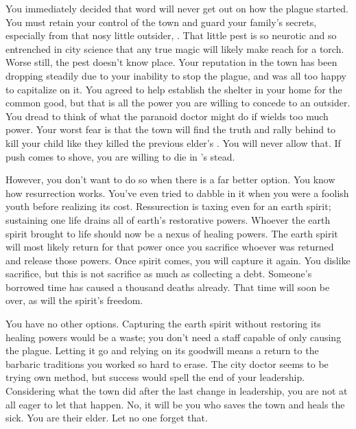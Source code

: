 \documentclass[char]{Pestilence}
\begin{document}
You immediately decided that word will never get out on how the plague started. You must retain your control of the town and guard your family's secrets, especially from that nosy little outsider, \cOutsider{}. That little pest is so neurotic and so entrenched in \cOutsider{\their} city science that any true magic will likely make \cOutsider{\them} reach for a torch. Worse still, the pest doesn't know \cOutsider{\their} place. Your reputation in the town has been dropping steadily due to your inability to stop the plague, and \cOutsider{} was all too happy to capitalize on it. You agreed to help \cOutsider{\them} establish the shelter in your home for the common good, but that is all the power you are willing to concede to an outsider. You dread to think of what the paranoid doctor might do if \cOutsider{\they} wields too much power. Your worst fear is that the town will find the truth and rally behind \cOutsider{\them} to kill your child like they killed the previous elder's \cPlaguebearer{\offspring}. You will never allow that. If push comes to shove, you are willing to die in \cRebel{}'s stead. 

However, you don't want to do so when there is a far better option. You know how resurrection works. You've even tried to dabble in it when you were a foolish youth before realizing its cost. Ressurection is taxing even for an earth spirit; sustaining one life drains all of earth's restorative powers. Whoever the earth spirit brought to life should now be a nexus of healing powers. The earth spirit will most likely return for that power once you sacrifice whoever was returned and release those powers. Once spirit comes, you will capture it again. You dislike sacrifice, but this is not sacrifice as much as collecting a debt. Someone's borrowed time has caused a thousand deaths already. That time will soon be over, as will the spirit's freedom. 

You have no other options. Capturing the earth spirit without restoring its healing powers would be a waste; you don't need a staff capable of only causing the plague. Letting it go and relying on its goodwill means a return to the barbaric traditions you worked so hard to erase. The city doctor seems to be trying \cOutsider{\their} own method, but \cOutsider{\their} success would spell the end of your leadership. Considering what the town did after the last change in leadership, you are not at all eager to let that happen. No, it will be you who saves the town and heals the sick. You are their elder. Let no one forget that.
\end{document}

